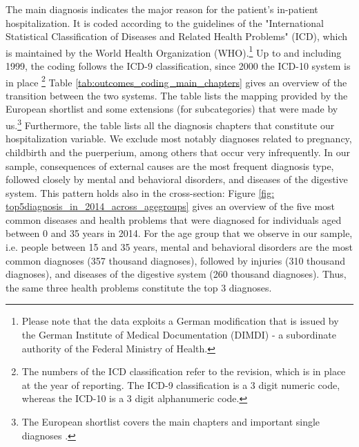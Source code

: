 \documentclass[11pt, a4paper]{article} %
\begin{document}
The main diagnosis indicates the major reason for the patient's in-patient hospitalization. It is coded according to the guidelines of the "International Statistical Classification of Diseases and Related Health Problems" (ICD), which is maintained by the World Health Organization (WHO).\footnote{Please note that the data exploits a German modification that is issued by the German Institute of Medical Documentation (DIMDI) - a subordinate authority of the Federal Ministry of Health.} Up to and including 1999, the coding follows the ICD-9 classification, since 2000 the ICD-10 system is in place \footnote{The numbers of the ICD classification refer to the revision, which is in place at the year of reporting. The ICD-9 classification is a 3 digit numeric code, whereas the ICD-10 is a 3 digit alphanumeric code.} Table \ref{tab:outcomes_coding_main_chapters} gives an overview of the transition between the two systems. The table lists the mapping provided by the European shortlist and some extensions (for subcategories) that were made by us.\footnote{The European shortlist covers the main chapters and important single diagnoses \citep[p. 76]{statistisches2012diagnosedaten}.} Furthermore, the table lists all the diagnosis chapters that constitute our hospitalization variable. We exclude most notably diagnoses related to pregnancy, childbirth and the puerperium, among others that occur very infrequently. In our sample, consequences of external causes are the most frequent diagnosis type, followed closely by mental and behavioral disorders, and diseases of the digestive system. This pattern holds also in the cross-section:  Figure \ref{fig: top5diagnosis_in_2014_across_agegroups} gives an overview of the five most common diseases and health problems that were diagnosed for individuals aged between 0 and 35 years in 2014. For the age group that we observe in our sample, i.e. people between 15 and 35 years, mental and behavioral disorders are the most common diagnoses (357 thousand diagnoses), followed by injuries (310 thousand diagnoses), and diseases of the digestive system (260 thousand diagnoses). Thus, the same three health problems constitute the top 3 diagnoses. \newline
\end{document}
